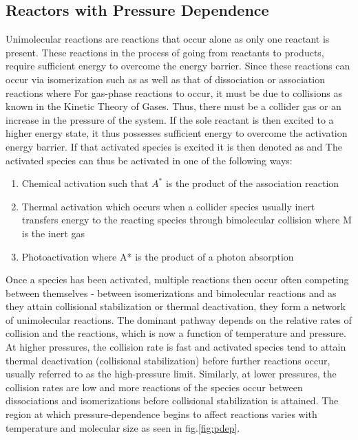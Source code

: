 \subsection{Reactors with Pressure Dependence}
Unimolecular reactions are reactions that occur alone as only one reactant is present. These reactions in the process of going from reactants to products, require sufficient energy to overcome the energy barrier. Since these reactions can occur via isomerization such as  as well as that of dissociation or association reactions where  For gas-phase reactions to occur, it must be due to collisions as known in the Kinetic Theory of Gases. Thus, there must be a collider gas or an increase in the pressure of the system. If the sole reactant is then excited to a higher energy state, it thus possesses sufficient energy to overcome the activation energy barrier. If that activated species is excited it is then denoted as  and  The activated species can thus be activated in one of the following ways:
\begin{enumerate}
    \item Chemical activation such that $A^*$ is the product of the association reaction 
    \item Thermal activation which occurs when a collider species usually inert transfers energy to the reacting species through bimolecular collision  where M is the inert gas
    \item Photoactivation where A* is the product of a photon absorption
\end{enumerate}

Once a species has been activated, multiple reactions then occur often competing between themselves - between isomerizations and bimolecular reactions and as they attain collisional stabilization or thermal deactivation, they form a network of unimolecular reactions. The dominant pathway depends on the relative rates of collision and the reactions, which is now a function of temperature and pressure. At higher pressures, the collision rate is fast and activated species tend to attain thermal deactivation (collisional stabilization) before further reactions occur, usually referred to as the high-pressure limit. Similarly, at lower pressures, the collision rates are low and more reactions of the species occur between dissociations and isomerizations  before collisional stabilization is attained. The region at which pressure-dependence begins to affect reactions varies with temperature and molecular size\cite{Wong2003TemperatureLimit} as seen in fig.\ref{fig:pdep}.

